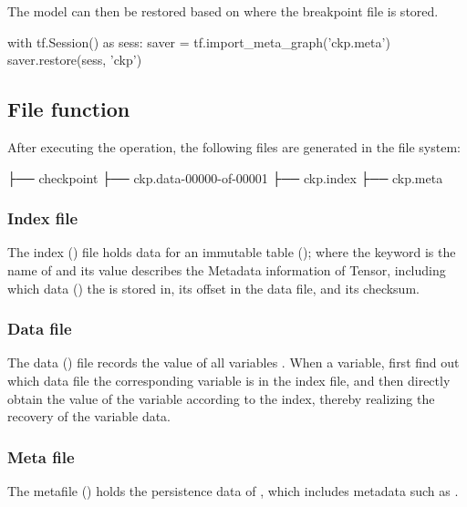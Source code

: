 \begin{content}
The model can then be restored based on where the breakpoint file is stored.

\begin{leftbar}
\begin{python}
with tf.Session() as sess:
  saver = tf.import_meta_graph('ckp.meta')
  saver.restore(sess, 'ckp')
\end{python}
\end{leftbar}


\subsection{File function}
After executing the  operation, the following files are generated in the file system:

\begin{leftbar}
\begin{python}
├── checkpoint
├── ckp.data-00000-of-00001
├── ckp.index
├── ckp.meta
\end{python}
\end{leftbar}


\subsubsection{Index file}
The index () file holds data for an immutable table (); where the keyword is the name of  and its value describes the \ascii Metadata information of {Tensor}, including which data () the  is stored in, its offset in the data file, and its checksum.


\subsubsection{Data file}
The data () file records the value of all variables . When  a variable, first find out which data file the corresponding variable is in the index file, and then directly obtain the value of the variable according to the index, thereby realizing the recovery of the variable data.


\subsubsection{Meta file}
The metafile () holds the persistence data of , which includes metadata such as .


\end{content}
